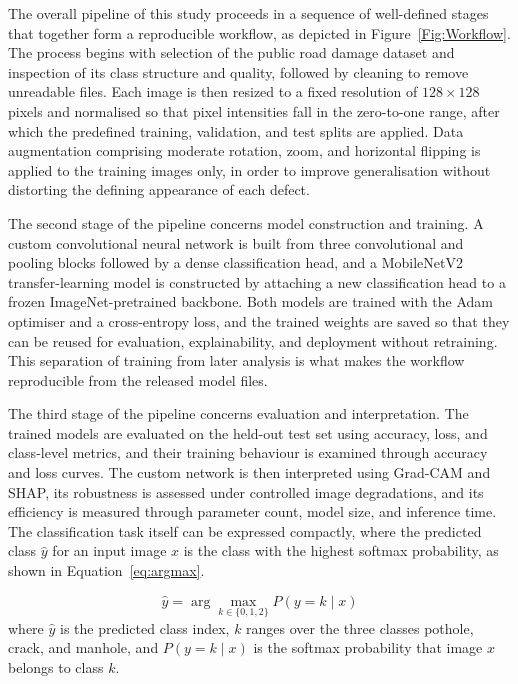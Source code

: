 \documentclass[preprint,12pt]{elsarticle}
\begin{document}
The overall pipeline of this study proceeds in a sequence of well-defined stages that together form a reproducible workflow, as depicted in Figure~\ref{Fig:Workflow}.
The process begins with selection of the public road damage dataset and inspection of its class structure and quality, followed by cleaning to remove unreadable files.
Each image is then resized to a fixed resolution of $128 \times 128$ pixels and normalised so that pixel intensities fall in the zero-to-one range, after which the predefined training, validation, and test splits are applied.
Data augmentation comprising moderate rotation, zoom, and horizontal flipping is applied to the training images only, in order to improve generalisation without distorting the defining appearance of each defect.

The second stage of the pipeline concerns model construction and training.
A custom convolutional neural network is built from three convolutional and pooling blocks followed by a dense classification head, and a MobileNetV2 transfer-learning model is constructed by attaching a new classification head to a frozen ImageNet-pretrained backbone.
Both models are trained with the Adam optimiser and a cross-entropy loss, and the trained weights are saved so that they can be reused for evaluation, explainability, and deployment without retraining.
This separation of training from later analysis is what makes the workflow reproducible from the released model files.

The third stage of the pipeline concerns evaluation and interpretation.
The trained models are evaluated on the held-out test set using accuracy, loss, and class-level metrics, and their training behaviour is examined through accuracy and loss curves.
The custom network is then interpreted using Grad-CAM and SHAP, its robustness is assessed under controlled image degradations, and its efficiency is measured through parameter count, model size, and inference time.
The classification task itself can be expressed compactly, where the predicted class $\hat{y}$ for an input image $x$ is the class with the highest softmax probability, as shown in Equation~\eqref{eq:argmax}.

\begin{equation}
\hat{y} = \arg\max_{k \in \{0,1,2\}} P(y = k \mid x)
\label{eq:argmax}
\end{equation}
where $\hat{y}$ is the predicted class index, $k$ ranges over the three classes pothole, crack, and manhole, and $P(y = k \mid x)$ is the softmax probability that image $x$ belongs to class $k$.
\end{document}
